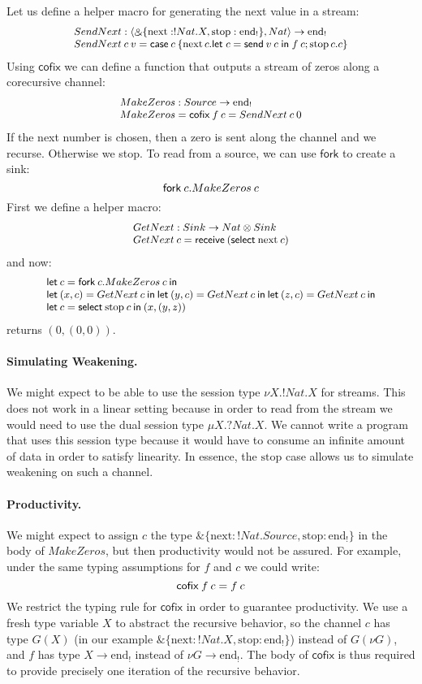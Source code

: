 \documentclass[orivec,envcountsame]{llncs}
\makeatletter
\newcommand{\with}{\mathbin\binampersand}
\newcommand{\uto}{\ensuremath{\rightarrow}}
\newcommand{\outterm}{\mathrm{end}_!}
\newcommand{\mkwd}[1]{\mathsf{#1}}
\newcommand{\clabel}[1]{\mathrm{#1}}
\newcommand{\gvsend}[2]{\mkwd{send}\:#1\:#2}
\newcommand{\gvreceive}[1]{\mkwd{receive}\:#1}
\newcommand{\gvlet}[3]{\mkwd{let}\;#1 = #2\;\mkwd{in}\;#3}
\newcommand{\gvselect}[2]{\mkwd{select}\:#1\:#2}
\newcommand{\gvcase}[2]{\mkwd{case}\:#1\:\{#2\}}
\newcommand{\gvfork}[2]{\mkwd{fork}\:#1.#2}
\newcommand{\lrkwd}{\mkwd{cofix}}
\newcommand{\key}{\mkwd}
\newcommand{\cofix}{\lrkwd}
\newcommand{\ba}{\begin{array}}
\newcommand{\ea}{\end{array}}
\newcommand{\bl}{\ba[t]{@{}l@{}}}
\newcommand{\el}{\ea}
\makeatother
\begin{document}
Let us define a helper macro for generating the next value in a stream:
\[\small
\bl
SendNext : \langle \with \{\clabel{next}: !Nat.X, \clabel{stop}: \outterm \}, Nat \rangle \uto \outterm \\
SendNext\:c\:v = \gvcase{c}{\clabel{next}\,c.\gvlet{c}{\gvsend{v}{c}}{f\:c};
                            \clabel{stop}\,c.c}
\el
\]
%
Using $\cofix$ we can define a function that outputs a stream of zeros along a corecursive
channel:
\[\small
  \bl
  MakeZeros : Source \uto \outterm \\
  MakeZeros = \cofix\:f\:c = SendNext\:c\:0
  \el
\]
If the next number is chosen, then a zero is sent along the channel and we recurse. Otherwise we
stop.
%
To read from a source, we can use $\key{fork}$ to create a sink:
\[\small
\gvfork{c}{MakeZeros\:c}
\]
%
First we define a helper macro:
\[\small
\bl
GetNext : Sink \uto Nat \otimes Sink \\
GetNext\:c = \gvreceive{(\gvselect{\clabel{next}}{c})} \\
\el
\]
and now:
\[\small
\bl
\key{let}\:c = \gvfork{c}{MakeZeros\:c}\:\key{in} \\
\key{let}\:(x, c) = GetNext\:c\:\key{in}\:
\key{let}\:(y, c) = GetNext\:c\:\key{in}\:
\key{let}\:(z, c) = GetNext\:c\:\key{in} \\
\key{let}\:c = \gvselect{\clabel{stop}}{c}\:\key{in}\:(x, (y, z)) \\
\el
\]
returns $(0, (0, 0))$.

\paragraph{Simulating Weakening.}
We might expect to be able to use the session type $\nu X.!Nat.X$ for streams. This does not work in
a linear setting because in order to read from the stream we would need to use the dual session type
$\mu X.?Nat.X$. We cannot write a program that uses this session type because it would have to
consume an infinite amount of data in order to satisfy linearity. In essence, the $\clabel{stop}$
case allows us to simulate weakening on such a channel.

\paragraph{Productivity.}
We might expect to assign $c$ the type $\with \{\clabel{next}: !Nat.Source, \clabel{stop}: \outterm
\}$ in the body of $MakeZeros$, but then productivity would not be assured. For example, under the
same typing assumptions for $f$ and $c$ we could write:
\[\small
\cofix\:f\:c = f\:c
\]
%
We restrict the typing rule for $\cofix$ in order to guarantee productivity. We use a fresh type
variable $X$ to abstract the recursive behavior, so the channel $c$ has type $G(X)$ (in our example
$\with \{\clabel{next}: !Nat.X, \clabel{stop}: \outterm \}$) instead of $G(\nu G)$, and $f$ has type
$X \uto \outterm$ instead of $\nu G \uto \outterm$. The body of $\cofix$ is thus required to provide
precisely one iteration of the recursive behavior.
\end{document}
